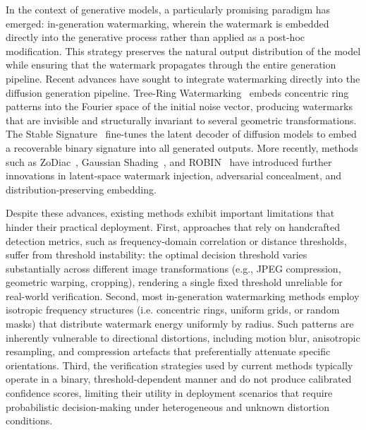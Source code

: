 \documentclass[lettersize,journal,review]{IEEEtran}
\begin{document}
 In the context of generative models, a particularly promising paradigm has emerged: in-generation watermarking, wherein the watermark is embedded directly into the generative process rather than applied as a post-hoc modification. This strategy preserves the natural output distribution of the model while ensuring that the watermark propagates through the entire generation pipeline. Recent advances have sought to integrate watermarking directly into the diffusion generation pipeline. Tree-Ring Watermarking~\cite{wen2023tree_ring} embeds concentric ring patterns into the Fourier space of the initial noise vector, producing watermarks that are invisible and structurally invariant to several geometric transformations. The Stable Signature~\cite{fernandez2023stable} fine-tunes the latent decoder of diffusion models to embed a recoverable binary signature into all generated outputs. More recently, methods such as ZoDiac~\cite{zhang2024attack}, Gaussian Shading~\cite{yang2024gaussian}, and ROBIN~\cite{huang2024robin} have introduced further innovations in latent-space watermark injection, adversarial concealment, and distribution-preserving embedding.

 Despite these advances, existing methods exhibit important limitations that hinder their practical deployment. First, approaches that rely on handcrafted detection metrics, such as frequency-domain correlation or distance thresholds, suffer from threshold instability: the optimal decision threshold varies substantially across different image transformations (e.g., JPEG compression, geometric warping, cropping), rendering a single fixed threshold unreliable for real-world verification. Second, most in-generation watermarking methods employ isotropic frequency structures (i.e. concentric rings, uniform grids, or random masks) that distribute watermark energy uniformly by radius. Such patterns are inherently vulnerable to directional distortions, including motion blur, anisotropic resampling, and compression artefacts that preferentially attenuate specific orientations. Third, the verification strategies used by current methods typically operate in a binary, threshold-dependent manner and do not produce calibrated confidence scores, limiting their utility in deployment scenarios that require probabilistic decision-making under heterogeneous and unknown distortion conditions.
\end{document}
